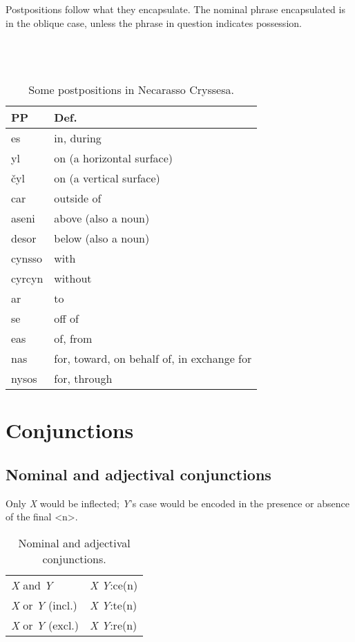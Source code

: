 \documentclass{book}
\begin{document}
Postpositions follow what they encapsulate. The nominal phrase encapsulated is in the oblique case, unless the phrase in question indicates possession. \\
~\\
   \\
   \\
  

\begin{table}[h]
  \caption{Some postpositions in Necarasso Cryssesa.}
  \centering
  \begin{tabu} to \linewidth {|l|X|}
    \hline
    PP & Def. \\
    \hline
    es & in, during \\
    yl & on (a horizontal surface) \\
    čyl & on (a vertical surface) \\
    car & outside of \\
    aseni & above (also a noun) \\
    desor & below (also a noun) \\
    cynsso & with \\
    cyrcyn & without \\
    ar & to \\
    se & off of \\
    eas & of, from \\
    nas & for, toward, on behalf of, in exchange for \\
    nysos & for, through \\
    \hline
  \end{tabu}
\end{table}

\chapter{Conjunctions}

\section{Nominal and adjectival conjunctions}

Only \emph{X} would be inflected; \emph{Y}'s case would be encoded in the presence or absence of the final <n>.

\begin{table}[ht]
  \caption{Nominal and adjectival conjunctions.}
  \centering
	\begin{tabular}{|l|l|}
	  \hline
	  \emph{X} and \emph{Y} & \emph{X} \emph{Y}:ce(n) \\
	  \emph{X} or \emph{Y} (incl.) & \emph{X} \emph{Y}:te(n) \\
	  \emph{X} or \emph{Y} (excl.) & \emph{X} \emph{Y}:re(n) \\ \hline
	\end{tabular}
\end{table}
\end{document}

